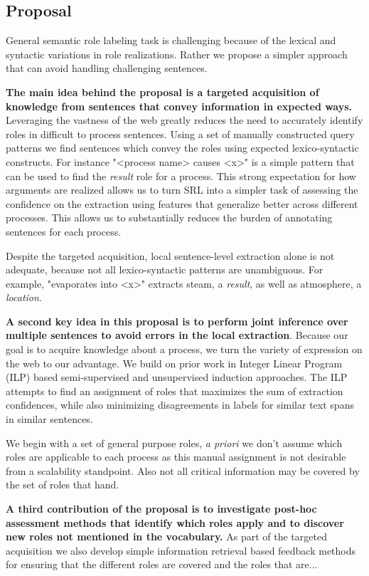 \subsection{Proposal}

General semantic role labeling task is challenging because of the lexical and syntactic variations in role realizations. 
Rather we propose a simpler approach that can avoid handling challenging sentences.

{\bf The main idea behind the proposal is a targeted acquisition of knowledge from sentences that convey information in expected ways.}
Leveraging the vastness of the web greatly reduces the need to accurately identify roles in difficult to process sentences.
Using a set of manually constructed query patterns we find sentences which convey the roles using expected lexico-syntactic constructs. 
For instance "<process name> causes <x>" is a simple pattern that can be used to find the {\em result} role for a process. 
This strong expectation for how arguments are realized allows us to turn SRL into a simpler task of assessing the confidence on the extraction using features that generalize better across different processes.  
This allows us to substantially reduces the burden of annotating sentences for each process.

Despite the targeted acquisition, local sentence-level extraction alone is not adequate, because not all lexico-syntactic patterns are unambiguous. 
For example, "evaporates into <x>" extracts steam, a {\em result}, as well as atmosphere, a {\em location}. 

{\bf A second key idea in this proposal is to perform joint inference over multiple sentences to avoid errors in the local extraction}.
Because our goal is to acquire knowledge about a process, we turn the variety of expression on the web to our advantage. 
We build on prior work in Integer Linear Program (ILP) based semi-supervised and unsupervised induction approaches. 
The ILP attempts to find an assignment of roles that maximizes the sum of extraction confidences, 
while also minimizing disagreements in labels for similar text spans in similar sentences.

We begin with a set of general purpose roles, {\em a priori} we don't assume which roles are applicable to each process as this manual assignment is not desirable from a scalability standpoint.
Also not all critical information may be covered by the set of roles that hand.

{\bf A third contribution of the proposal is to investigate post-hoc assessment methods that identify which roles apply and to discover new roles not mentioned in the vocabulary.}
As part of the targeted acquisition we also develop simple information retrieval based feedback methods for ensuring that the different roles are covered and the roles that are...

